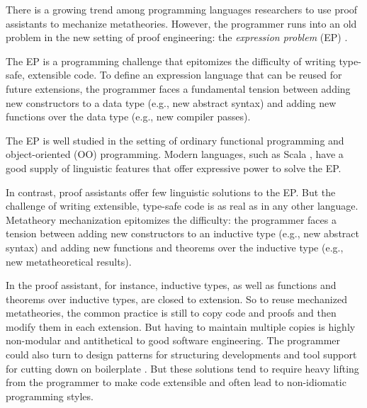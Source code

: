
There is a growing trend among programming languages researchers
to use proof assistants to mechanize meta\-theories.
%
However, the programmer runs into an old problem
in the new setting of proof engineering:
the \emph{expression problem} (EP) \cite{wadler-ep}.

The EP is a programming challenge that
epitomizes the difficulty of writing type-safe, extensible code.
To define an expression language that can be reused for future extensions,
the programmer faces a fundamental tension \cite{reynolds1975} between
adding new constructors to a data type (e.g., new abstract syntax) and
adding new functions over the data type (e.g., new compiler passes).

The EP is well studied in the setting of ordinary functional
programming and object-oriented (OO) programming.
Modern languages, such as Scala \cite{scala-oopsla05}, have a good
supply of linguistic features that offer expressive power to solve the
EP. %

In contrast, proof assistants offer few linguistic solutions to the EP.
But the challenge of writing extensible, type-safe code is
as real as in any other language.
Metatheory mechanization epitomizes the difficulty:
the programmer faces a tension between adding new constructors to an inductive type
(e.g., new abstract syntax) and adding new functions and theorems over
the inductive type (e.g., new meta\-theoretical results).

In the \citeauthor{coq} proof assistant, for instance, inductive types, as well as functions and
theorems over inductive types, are closed to extension.
So to reuse mechanized metatheories,
the common practice is still to copy code and proofs and then modify them in each extension.
But having to maintain multiple copies is highly non-modular and
antithetical to good software engineering.
%
The programmer could also turn to design patterns for structuring developments
and tool support for cutting down on boilerplate
\cite{delaware2011,delaware2013,schwaab2013modular,keuchel2013generic,forsta2020}.
But these solutions tend to require heavy lifting from the programmer to make code
extensible and often lead to non-idiomatic programming styles.

